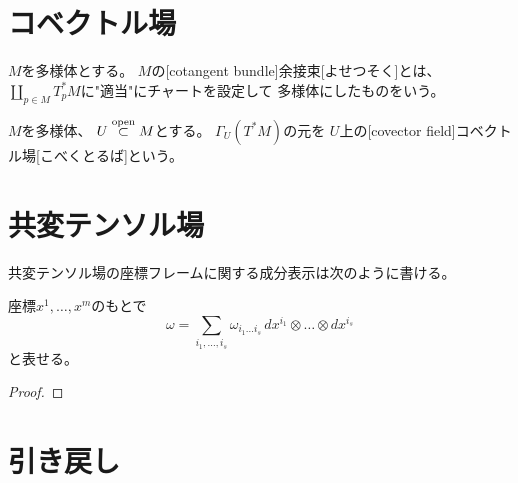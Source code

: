 \documentclass[report]{jlreq}
\begin{document}
%
\section{コベクトル場}

\begin{definition}[余接束]
    $M$を多様体とする。
    $M$の[cotangent bundle]{余接束}[よせつそく]とは、
    $\coprod_{p \in M} T_p^* M$に"適当"\TODO{}にチャートを設定して
    {\smooth}多様体にしたものをいう。
\end{definition}

\begin{definition}[コベクトル場]
    $M$を多様体、
    $U \stackrel{\text{open}}{\subset} M$とする。
    $\Gamma_U(T^*M)$の元を
    $U$上の[covector field]{コベクトル場}[こべくとるば]という。
\end{definition}

%
\section{共変テンソル場}

\begin{definition}[共変テンソル場]
    \TODO{}
\end{definition}

共変テンソル場の座標フレームに関する成分表示は次のように書ける。

\begin{proposition}[共変テンソル場の座標フレームに関する成分表示]
    座標$x^1, \dots, x^m$のもとで
    \begin{equation}
        \omega = \sum_{i_1, \dots, i_s}
            \omega_{i_1 \dots i_s} \,
            dx^{i_1} \otimes \dots \otimes dx^{i_s}
    \end{equation}
    と表せる。
\end{proposition}

\begin{proof}
    \TODO{}
\end{proof}

%
\section{引き戻し}
\end{document}

